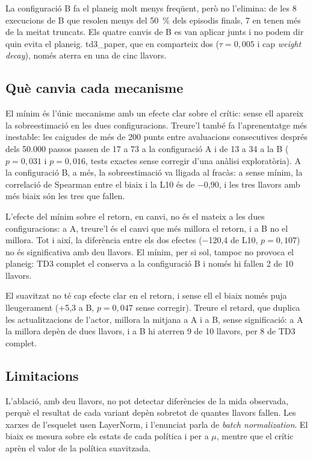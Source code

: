 La configuració B fa el planeig molt menys freqüent, però no l'elimina: de les 8 execucions de B que resolen menys del 50~\% dels episodis finals, 7 en tenen més de la meitat truncats. Els quatre canvis de B es van aplicar junts i no podem dir quin evita el planeig. td3\_paper, que en comparteix dos ($\tau = 0{,}005$ i cap \emph{weight decay}), només aterra en una de cinc llavors.

\subsection{Què canvia cada mecanisme}\label{sec:mecanismes}

El mínim és l'únic mecanisme amb un efecte clar sobre el crític: sense ell apareix la sobreestimació en les dues configuracions. Treure'l també fa l'aprenentatge més inestable: les caigudes de més de 200 punts entre avaluacions consecutives després dels 50.000 passos passen de 17 a 73 a la configuració A i de 13 a 34 a la B ($p = 0{,}031$ i $p = 0{,}016$, tests exactes sense corregir d'una anàlisi exploratòria). A la configuració B, a més, la sobreestimació va lligada al fracàs: a sense mínim, la correlació de Spearman entre el biaix i la L10 és de −0,90, i les tres llavors amb més biaix són les tres que fallen.

L'efecte del mínim sobre el retorn, en canvi, no és el mateix a les dues configuracions: a A, treure'l és el canvi que més millora el retorn, i a B no el millora. Tot i així, la diferència entre els dos efectes (−120,4 de L10, $p = 0{,}107$) no és significativa amb deu llavors. El mínim, per si sol, tampoc no provoca el planeig: TD3 complet el conserva a la configuració B i només hi fallen 2 de 10 llavors.

El suavitzat no té cap efecte clar en el retorn, i sense ell el biaix només puja lleugerament (+5,3 a B, $p = 0{,}047$ sense corregir). Treure el retard, que duplica les actualitzacions de l'actor, millora la mitjana a A i a B, sense significació: a A la millora depèn de dues llavors, i a B hi aterren 9 de 10 llavors, per 8 de TD3 complet.

\subsection{Limitacions}\label{sec:limitacions}

L'ablació, amb deu llavors, no pot detectar diferències de la mida observada, perquè el resultat de cada variant depèn sobretot de quantes llavors fallen. Les xarxes de l'esquelet usen LayerNorm, i l'enunciat parla de \emph{batch normalization}. El biaix es mesura sobre els estats de cada política i per a $\mu$, mentre que el crític aprèn el valor de la política suavitzada.
